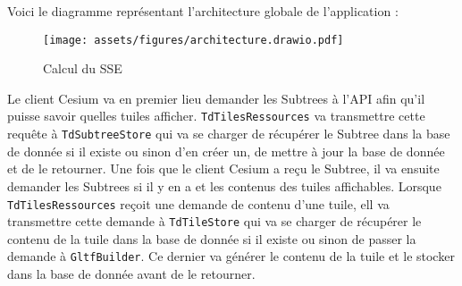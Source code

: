 Voici le diagramme représentant l'architecture globale de l'application :

\begin{figure}[H]
    \centering
    \texttt{[image: assets/figures/architecture.drawio.pdf]}
    \caption{Calcul du SSE \cite{3d-tiles-specification}}
    \label{fig:lods-colors}
\end{figure}

\newpage

Le client Cesium va en premier lieu demander les Subtrees à l'API afin qu'il puisse savoir quelles tuiles afficher. \texttt{TdTilesRessources} va transmettre cette requête à \texttt{TdSubtreeStore} qui va se charger de récupérer le Subtree dans la base de donnée si il existe ou sinon d'en créer un, de mettre à jour la base de donnée et de le retourner. Une fois que le client Cesium a reçu le Subtree, il va ensuite demander les Subtrees si il y en a et les contenus des tuiles affichables. Lorsque \texttt{TdTilesRessources} reçoit une demande de contenu d'une tuile, ell va transmettre cette demande à \texttt{TdTileStore} qui va se charger de récupérer le contenu de la tuile dans la base de donnée si il existe ou sinon de passer la demande à \texttt{GltfBuilder}. Ce dernier va générer le contenu de la tuile et le stocker dans la base de donnée avant de le retourner.